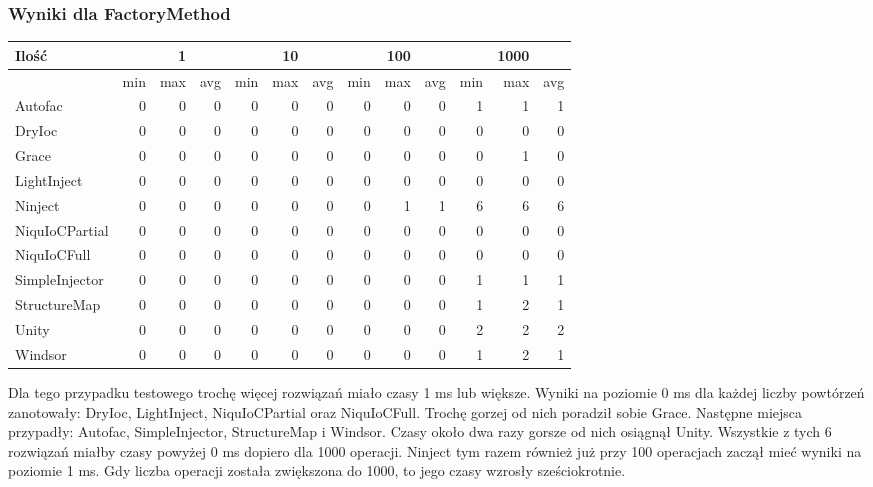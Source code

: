 \documentclass[12pt]{article}
\begin{document}
\subsubsection{Wyniki dla FactoryMethod}
\begin{center}
\begin{small}
	\begin{tabular}{ | l | r r r | r r r | r r r | r r r | }
    		\hline
Ilość & & 1 & & & 10 & & & 100 & & & 1000 & \\ \hline
 & min & max & avg & min & max & avg & min & max & avg & min & max & avg \\ \hline
Autofac & 0 & 0 & 0 & 0 & 0 & 0 & 0 & 0 & 0 & 1 & 1 & 1 \\ \hline
DryIoc & 0 & 0 & 0 & 0 & 0 & 0 & 0 & 0 & 0 & 0 & 0 & 0 \\ \hline
Grace & 0 & 0 & 0 & 0 & 0 & 0 & 0 & 0 & 0 & 0 & 1 & 0 \\ \hline
LightInject & 0 & 0 & 0 & 0 & 0 & 0 & 0 & 0 & 0 & 0 & 0 & 0 \\ \hline
Ninject & 0 & 0 & 0 & 0 & 0 & 0 & 0 & 1 & 1 & 6 & 6 & 6 \\ \hline
NiquIoCPartial & 0 & 0 & 0 & 0 & 0 & 0 & 0 & 0 & 0 & 0 & 0 & 0 \\ \hline
NiquIoCFull & 0 & 0 & 0 & 0 & 0 & 0 & 0 & 0 & 0 & 0 & 0 & 0 \\ \hline
SimpleInjector & 0 & 0 & 0 & 0 & 0 & 0 & 0 & 0 & 0 & 1 & 1 & 1 \\ \hline
StructureMap & 0 & 0 & 0 & 0 & 0 & 0 & 0 & 0 & 0 & 1 & 2 & 1 \\ \hline
Unity & 0 & 0 & 0 & 0 & 0 & 0 & 0 & 0 & 0 & 2 & 2 & 2 \\ \hline
Windsor & 0 & 0 & 0 & 0 & 0 & 0 & 0 & 0 & 0 & 1 & 2 & 1 \\ \hline
  	\end{tabular}
\end{small}
\end{center}
Dla tego przypadku testowego trochę więcej rozwiązań miało czasy 1 ms lub większe. Wyniki na poziomie 0 ms dla każdej liczby powtórzeń zanotowały: DryIoc, LightInject, NiquIoCPartial oraz NiquIoCFull. Trochę gorzej od nich poradził sobie Grace. Następne miejsca przypadły: Autofac, SimpleInjector, StructureMap i Windsor. Czasy około dwa razy gorsze od nich osiągnął Unity. Wszystkie z tych 6 rozwiązań miałby czasy powyżej 0 ms dopiero dla 1000 operacji. Ninject tym razem również już przy 100 operacjach zaczął mieć wyniki na poziomie 1 ms.  Gdy liczba operacji została zwiększona do 1000, to jego czasy wzrosły sześciokrotnie.
\end{document}
